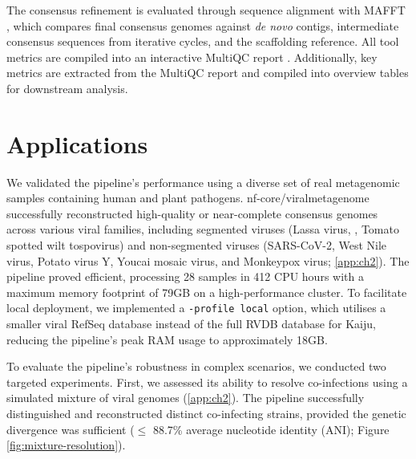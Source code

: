 The consensus refinement is evaluated through sequence alignment with MAFFT \citep{Katoh2002-ox}, which compares final consensus genomes against \textit{de novo} contigs, intermediate consensus sequences from iterative cycles, and the scaffolding reference. All tool metrics are compiled into an interactive MultiQC report \citep{Ewels2016-hs}. Additionally, key metrics are extracted from the MultiQC report and compiled into overview tables for downstream analysis.

\section{Applications}
We validated the pipeline's performance using a diverse set of real metagenomic samples containing human and plant pathogens. nf-core/viralmetagenome successfully reconstructed high-quality or near-complete consensus genomes across various viral families, including segmented viruses (Lassa virus, , Tomato spotted wilt tospovirus) and non-segmented viruses (SARS-CoV-2, West Nile virus, Potato virus Y, Youcai mosaic virus, and Monkeypox virus; \autoref{app:ch2}). The pipeline proved efficient, processing 28 samples in 412 CPU hours with a maximum memory footprint of 79GB on a high-performance cluster. To facilitate local deployment, we implemented a \texttt{-profile local} option, which utilises a smaller viral RefSeq database instead of the full RVDB database for Kaiju, reducing the pipeline's peak RAM usage to approximately 18GB.

To evaluate the pipeline’s robustness in complex scenarios, we conducted two targeted experiments. First, we assessed its ability to resolve co-infections using a simulated mixture of viral genomes (\autoref{app:ch2}). The pipeline successfully distinguished and reconstructed distinct co-infecting strains, provided the genetic divergence was sufficient ($\le$ 88.7\% average nucleotide identity (ANI); Figure \ref{fig:mixture-resolution}).

